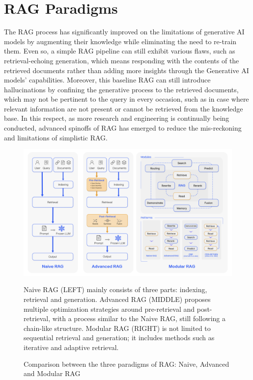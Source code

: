 \section{RAG Paradigms}
The RAG process has significantly improved on the limitations of generative AI models by augmenting their knowledge while eliminating the need to re-train them. Even so, a simple RAG pipeline can still exhibit various flaws, such as retrieval-echoing generation, which means responding with the contents of the retrieved documents rather than adding more insights through the Generative AI models' capabilities. Moreover, this baseline RAG can still introduce hallucinations by confining the generative process to the retrieved documents, which may not be pertinent to the query in every occasion, such as in case where relevant information are not present or cannot be retrieved from the knowledge base. In this respect, as more research and engineering is continually being conducted, advanced spinoffs of RAG has emerged to reduce the mis-reckoning and limitations of simplistic RAG.
\begin{figure}[H]
    \centering
    \includegraphics[width=\linewidth]{./figures/RAG_FrameCompre_eng.png}
    \caption{Comparison between the three paradigms of RAG: Naive, Advanced and Modular RAG \cite{ragforllmsasurvey}}
    \begin{flushleft}
        \small Naive RAG (LEFT)  mainly consists of three parts: indexing, retrieval and generation. Advanced RAG (MIDDLE) proposes multiple optimization strategies around pre-retrieval and post-retrieval, with a process similar to the Naive RAG, still following a chain-like structure. Modular RAG (RIGHT) is not limited to sequential retrieval and generation; it includes methods such as iterative and adaptive retrieval.
    \end{flushleft}
\end{figure}

